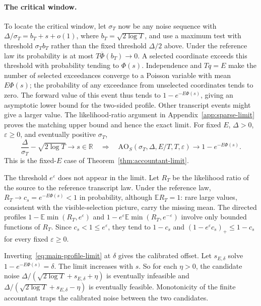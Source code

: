 \documentclass[11pt]{article}
\theoremstyle{remark}
\newcommand{\R}{\mathbb R}
\newcommand{\E}{\mathbb E}
\newcommand{\AO}{\mathrm{AO}}
\begin{document}
\paragraph{The critical window.}
To locate the critical window, let $\sigma_T$ now be any noise sequence with
$\Delta/\sigma_T=b_T+s+o(1)$, where $b_T=\sqrt{2\log T}$, and use a maximum
test with threshold $\sigma_T b_T$ rather than the fixed threshold $\Delta/2$
above. Under the reference law its probability is at most
$T\overline\Phi(b_T)\to0$. A selected coordinate exceeds this threshold with
probability tending to $\Phi(s)$.
Independence and $Tq=E$ make the number of selected exceedances converge to a
Poisson variable with mean $E\Phi(s)$; the probability of any exceedance from
unselected coordinates tends to zero. The forward value of this event thus
tends to $1-e^{-E\Phi(s)}$, giving an asymptotic lower bound for the two-sided
profile. Other transcript events might give a larger value. The
likelihood-ratio argument in Appendix~\ref{app:sparse-limit} proves the
matching upper bound and hence the exact limit. For fixed $E$, $\Delta>0$,
$\varepsilon\geq0$, and eventually positive $\sigma_T$,
\begin{equation}\label{eq:main-profile-limit}
 \frac{\Delta}{\sigma_T}-\sqrt{2\log T}\longrightarrow s\in\R
 \quad\Longrightarrow\quad
 \AO_S(\sigma_T,\Delta,E/T,T,\varepsilon)
 \longrightarrow1-e^{-E\Phi(s)}.
\end{equation}
This is the fixed-$E$ case of Theorem~\ref{thm:accountant-limit}.

The threshold $e^\varepsilon$ does not appear in the limit. Let $R_T$ be the
likelihood ratio of the source to the reference transcript law. Under the
reference law, $R_T\to c_s=e^{-E\Phi(s)}<1$ in probability, although
$\E R_T=1$: rare large values, consistent with the visible-selection picture,
carry the missing mean. The directed profiles
$1-\E\min(R_T,e^\varepsilon)$ and $1-e^\varepsilon\E\min(R_T,e^{-\varepsilon})$
involve only bounded functions of $R_T$. Since $c_s<1\leq e^\varepsilon$, they
tend to $1-c_s$ and $(1-e^\varepsilon c_s)_+\leq1-c_s$ for every fixed
$\varepsilon\geq0$.

Inverting~\eqref{eq:main-profile-limit} at $\delta$ gives the calibrated
offset. Let $s_{E,\delta}$ solve $1-e^{-E\Phi(s)}=\delta$. The limit increases
with $s$. So for each $\eta>0$, the candidate noise
$\Delta/(\sqrt{2\log T}+s_{E,\delta}+\eta)$ is eventually infeasible and
$\Delta/(\sqrt{2\log T}+s_{E,\delta}-\eta)$ is eventually feasible.
Monotonicity of the finite accountant traps the calibrated noise between the
two candidates.
\end{document}
